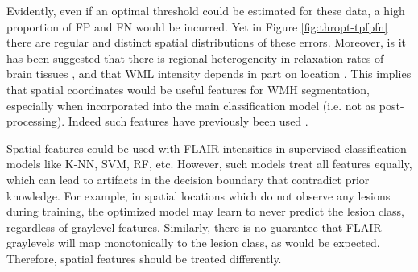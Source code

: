 \par
Evidently, even if an optimal threshold could be estimated for these data, a high proportion of FP and FN would be incurred.
Yet in Figure \ref{fig:thropt-tpfpfn} there are regular and distinct spatial distributions of these errors.
Moreover, is it has been suggested that there is regional heterogeneity in relaxation rates of brain tissues \cite{Sled2004}, and that WML intensity depends in part on location \cite{Stevenson2000,Harmouche2015}.
This implies that spatial coordinates would be useful features for WMH segmentation, especially when incorporated into the main classification model (i.e. not as post-processing).
Indeed such features have previously been used \cite{Anbeek2004,Anbeek2005,Dyrby2008,Griffanti2016,Dadar2017}.
\par
Spatial features could be used with FLAIR intensities in supervised classification models like K-NN, SVM, RF, etc.
However, such models treat all features equally, which can lead to artifacts in the decision boundary that contradict prior knowledge.
For example, in spatial locations which do not observe any lesions during training, the optimized model may learn to never predict the lesion class, regardless of graylevel features.
Similarly, there is no guarantee that FLAIR graylevels will map monotonically to the lesion class, as would be expected.
Therefore, spatial features should be treated differently.
